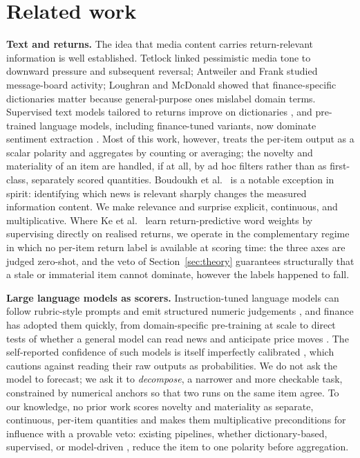 \documentclass{elektr}
\begin{document}
\section{Related work}
\label{sec:related}
\textbf{Text and returns.} The idea that media content carries return-relevant information is well established. Tetlock \cite{tetlock2007} linked pessimistic media tone to downward pressure and subsequent reversal; Antweiler and Frank \cite{antweiler2004} studied message-board activity; Loughran and McDonald \cite{loughran2011} showed that finance-specific dictionaries matter because general-purpose ones mislabel domain terms. Supervised text models tailored to returns improve on dictionaries \cite{ke2019}, and pre-trained language models, including finance-tuned variants, now dominate sentiment extraction \cite{araci2019,huang2023}. Most of this work, however, treats the per-item output as a scalar polarity and aggregates by counting or averaging; the novelty and materiality of an item are handled, if at all, by ad hoc filters rather than as first-class, separately scored quantities. Boudoukh et al.\ \cite{boudoukh2019} is a notable exception in spirit: identifying which news is relevant sharply changes the measured information content. We make relevance and surprise explicit, continuous, and multiplicative. Where Ke et al.\ \cite{ke2019} learn return-predictive word weights by supervising directly on realised returns, we operate in the complementary regime in which no per-item return label is available at scoring time: the three axes are judged zero-shot, and the veto of Section~\ref{sec:theory} guarantees structurally that a stale or immaterial item cannot dominate, however the labels happened to fall.

\textbf{Large language models as scorers.} Instruction-tuned language models can follow rubric-style prompts and emit structured numeric judgements \cite{brown2020}, and finance has adopted them quickly, from domain-specific pre-training at scale \cite{wu2023} to direct tests of whether a general model can read news and anticipate price moves \cite{lopezlira2023}. The self-reported confidence of such models is itself imperfectly calibrated \cite{steyvers2025}, which cautions against reading their raw outputs as probabilities. We do not ask the model to forecast; we ask it to \emph{decompose}, a narrower and more checkable task, constrained by numerical anchors so that two runs on the same item agree. To our knowledge, no prior work scores novelty and materiality as separate, continuous, per-item quantities and makes them multiplicative preconditions for influence with a provable veto: existing pipelines, whether dictionary-based, supervised, or model-driven \cite{loughran2011,ke2019,araci2019,huang2023,lopezlira2023}, reduce the item to one polarity before aggregation.
\end{document}
